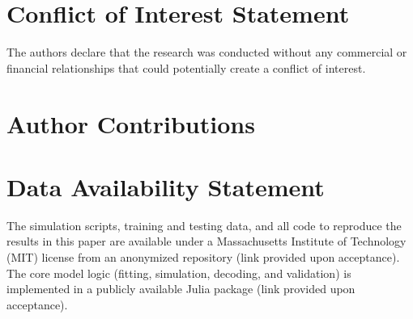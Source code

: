 \section*{Conflict of Interest Statement}
The authors declare that the research was conducted without any commercial or financial relationships that could potentially create a conflict of interest.

\section*{Author Contributions}

\section*{Data Availability Statement}
The simulation scripts, training and testing data, and all code to reproduce the results in this paper are available under a Massachusetts Institute of Technology (MIT) license from an anonymized repository (link provided upon acceptance). The core model logic (fitting, simulation, decoding, and validation) is implemented in a publicly available Julia package (link provided upon acceptance).
